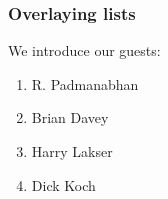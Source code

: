 \documentclass{beamer}
\begin{document}
\begin{frame}
\frametitle{Overlaying lists}

We introduce our guests:
\begin{enumerate}
\item<1-> R. Padmanabhan
\item<2-> Brian Davey
\item<3-> Harry Lakser
\item<4-> Dick Koch
\end{enumerate}
\end{frame}
\end{document}
